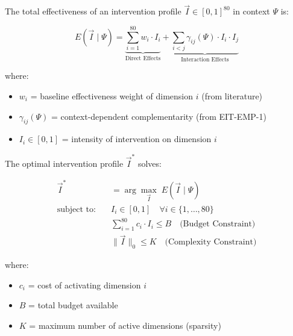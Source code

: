 \begin{tcolorbox}[colback=blue!5!white, colframe=blue!75!black,
    title=\textbf{Definition EIT-EMP-2-D1: Intervention Effectiveness Function}]

The total effectiveness of an intervention profile $\vec{I} \in [0,1]^{80}$ in context $\Psi$ is:

\begin{equation}
\boxed{E(\vec{I} \;|\; \Psi) = \underbrace{\sum_{i=1}^{80} w_i \cdot I_i}_{\text{Direct Effects}} + \underbrace{\sum_{i<j} \gamma_{ij}(\Psi) \cdot I_i \cdot I_j}_{\text{Interaction Effects}}}
\label{eq:effectiveness}
\end{equation}

where:
\begin{itemize}[nosep]
    \item $w_i$ = baseline effectiveness weight of dimension $i$ (from literature)
    \item $\gamma_{ij}(\Psi)$ = context-dependent complementarity (from EIT-EMP-1)
    \item $I_i \in [0,1]$ = intensity of intervention on dimension $i$
\end{itemize}

\end{tcolorbox}

\begin{tcolorbox}[colback=blue!5!white, colframe=blue!75!black,
    title=\textbf{Definition EIT-EMP-2-D2: Constrained Optimization Problem}]

The optimal intervention profile $\vec{I}^*$ solves:

\begin{align}
\vec{I}^* &= \arg\max_{\vec{I}} \; E(\vec{I} \;|\; \Psi) \label{eq:objective}\\
\text{subject to:} \quad & I_i \in [0,1] \quad \forall i \in \{1, \ldots, 80\} \label{eq:bounds}\\
& \sum_{i=1}^{80} c_i \cdot I_i \leq B \quad \text{(Budget Constraint)} \label{eq:budget}\\
& \|\vec{I}\|_0 \leq K \quad \text{(Complexity Constraint)} \label{eq:sparsity}
\end{align}

where:
\begin{itemize}[nosep]
    \item $c_i$ = cost of activating dimension $i$
    \item $B$ = total budget available
    \item $K$ = maximum number of active dimensions (sparsity)
\end{itemize}

\end{tcolorbox}

